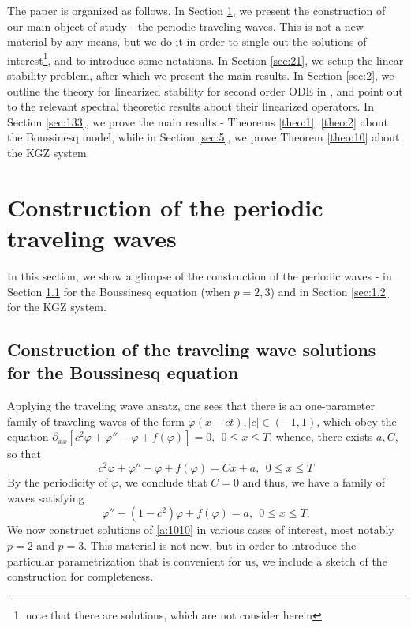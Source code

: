 \documentclass[final,11pt,leqno]{amsart}
\begin{document}
The paper is organized as follows. In Section \ref{sec:11}, we present the construction of our main object of study - the periodic traveling waves. This is not a new material by any means, but we do it in order to single out the solutions of interest\footnote{note that there are solutions, which are not consider herein},  and to introduce some notations. In Section \ref{sec:21}, we setup the linear stability problem, after which we present the main results. In Section \ref{sec:2}, we outline the theory for linearized stability for second order ODE in \cite{SS1},   and point out to the relevant spectral theoretic results about their linearized operators. In Section \ref{sec:133}, we prove the main results - Theorems \ref{theo:1}, \ref{theo:2} about the Boussinesq model, while in Section \ref{sec:5}, we prove Theorem \ref{theo:10} about the KGZ system. 

  
\section{Construction of the periodic traveling waves}
\label{sec:11}
In this section, we show a glimpse of
the construction of the periodic waves  - in Section \ref{sec:1.1}   for the Boussinesq equation (when $p=2,3$) and in Section  \ref{sec:1.2}  for the KGZ system.
\subsection{Construction of the traveling wave solutions for the Boussinesq equation}
\label{sec:1.1}
Applying the traveling wave ansatz,   one sees that there is an one-parameter family of traveling waves of the form ${\varphi}(x-c t), |c|\in (-1,1)$, which obey the equation
$
{\partial}_{xx}[c^2{\varphi}+{\varphi}''-{\varphi}+f({\varphi})]=0, \ \ 0\leq x\leq T.
$
whence, there exists $a,C$, so that
$$
c^2{\varphi}+{\varphi}''-{\varphi}+f({\varphi})=C x+a,  \ \ 0\leq x\leq T
$$
By the periodicity of ${\varphi}$, we   conclude that $C=0$ and thus, we have a   family of waves   satisfying
\begin{equation}
\label{a:1010}
 {\varphi}''-(1-c^2){\varphi}+f({\varphi})=a, \ \ 0\leq x\leq T.
\end{equation}
We now construct   solutions of \eqref{a:1010} in various cases of interest, most notably $p=2$ and $p=3$. This material is not new, but in order to
introduce the particular parametrization that is convenient for us,   we include a sketch of the construction for completeness.
\end{document}
